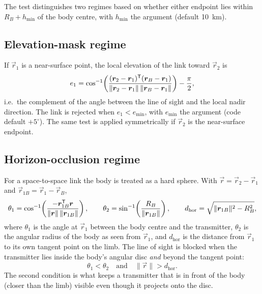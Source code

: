 The test distinguishes two regimes based on whether either endpoint lies within
$R_B + h_\mathrm{min}$ of the body centre, with $h_\mathrm{min}$ the
 argument (default \SI{10}{\kilo\meter}).

\subsection{Elevation-mask regime}
\label{sec:lb-visibility-elev}

If $\vec{r}_1$ is a near-surface point, the local elevation of the link toward
$\vec{r}_2$ is
\begin{equation}
  e_1
  =
  \cos^{-1}
  \!\left(
    \frac{(\bm{r}_2 - \bm{r}_1)^{\mathsf{T}}(\bm{r}_B - \bm{r}_1)}
         {\lVert \bm{r}_2 - \bm{r}_1 \rVert \,
          \lVert \bm{r}_B - \bm{r}_1 \rVert}
  \right)
  - \frac{\pi}{2},
  \label{eq:lb-elevation}
\end{equation}
i.e.\ the complement of the angle between the line of sight and the local
nadir direction.  The link is rejected when $e_1 < e_\mathrm{min}$, with
$e_\mathrm{min}$ the  argument (code default
$+5^\circ$).  The same test is applied symmetrically if $\vec{r}_2$ is the
near-surface endpoint.

\subsection{Horizon-occlusion regime}
\label{sec:lb-visibility-horizon}

For a space-to-space link the body is treated as a hard sphere.  With
$\vec{r} = \vec{r}_2 - \vec{r}_1$ and $\vec{r}_{1B} = \vec{r}_1 - \vec{r}_B$,
\begin{equation}
  \theta_1
  = \cos^{-1}\!\left(
      \frac{-\bm{r}_{1B}^{\mathsf{T}} \bm{r}}
           {\lVert \bm{r} \rVert\,\lVert \bm{r}_{1B}\rVert}\right),
  \qquad
  \theta_2
  = \sin^{-1}\!\left(\frac{R_B}{\lVert \bm{r}_{1B}\rVert}\right),
  \qquad
  d_\mathrm{hor}
  = \sqrt{\lVert \bm{r}_{1B}\rVert^2 - R_B^2},
  \label{eq:lb-horizon-angles}
\end{equation}
where $\theta_1$ is the angle at $\vec{r}_1$ between the body centre and the
transmitter, $\theta_2$ is the angular radius of the body as seen from
$\vec{r}_1$, and $d_\mathrm{hor}$ is the distance from $\vec{r}_1$ to its own
tangent point on the limb.  The line of sight is blocked when the transmitter
lies inside the body's angular disc \emph{and} beyond the tangent point:
\begin{equation}
  \theta_1 < \theta_2
  \quad\text{and}\quad
  \lVert \vec{r} \rVert > d_\mathrm{hor}.
  \label{eq:lb-blocked}
\end{equation}
The second condition is what keeps a transmitter that is in front of the body
(closer than the limb) visible even though it projects onto the disc.


